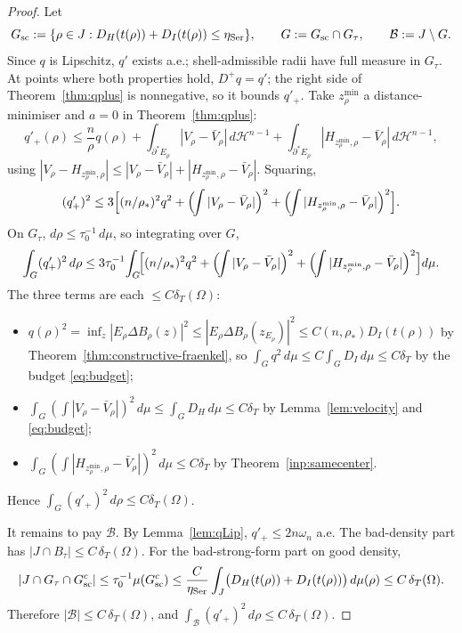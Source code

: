 \documentclass[11pt]{amsart}
\theoremstyle{definition}
\newcommand{\Om}{\Omega}
\newcommand{\dT}{\delta_T}
\newcommand{\rstar}{\rho_*}
\newcommand{\Hn}{\mathcal H^{n-1}}
\begin{document}
\begin{proof}
Let
\[
   G_{\rm sc}:=\{\rho\in J:
      D_H(t(\rho))+D_I(t(\rho))\le\eta_{\rm Ser}\},
   \qquad
   G:=G_{\rm sc}\cap G_\tau,
   \qquad \mathcal B:=J\setminus G .
\]
Since \(q\) is Lipschitz, \(q'\) exists a.e.; shell-admissible radii have full
measure in \(G_\tau\).  At points where both properties hold, \(D^+q=q'\); the
right side of Theorem~\ref{thm:qplus} is nonnegative, so it bounds \(q'_+\).
Take \(z_\rho^{\min}\) a distance-minimiser and \(a=0\) in
Theorem~\ref{thm:qplus}:
\[
   q'_+(\rho)\le \frac{n}{\rho}q(\rho)
   +\int_{\partial^*E_\rho}|V_\rho-\bar V_\rho|\,d\Hn
   +\int_{\partial^*E_\rho}|H_{z_\rho^{\min},\rho}-\bar V_\rho|\,d\Hn ,
\]
using \(|V_\rho-H_{z_\rho^{\min},\rho}|\le|V_\rho-\bar V_\rho|+
|H_{z_\rho^{\min},\rho}-\bar V_\rho|\).  Squaring,
\[
   (q'_+)^2\le 3\Bigl[(n/\rstar)^2 q^2
   +\Bigl(\!\int|V_\rho-\bar V_\rho|\Bigr)^2
   +\Bigl(\!\int|H_{z_\rho^{\min},\rho}-\bar V_\rho|\Bigr)^2\Bigr].
\]
On \(G_\tau\), \(d\rho\le\tau_0^{-1}\,d\mu\), so integrating over \(G\),
\[
   \int_G(q'_+)^2\,d\rho
   \le 3\tau_0^{-1}\!\int_G\!\Bigl[(n/\rstar)^2 q^2
   +\Bigl(\!\int|V_\rho-\bar V_\rho|\Bigr)^2
   +\Bigl(\!\int|H_{z_\rho^{\min},\rho}-\bar V_\rho|\Bigr)^2\Bigr]d\mu .
\]
The three terms are each \(\le C\dT(\Om)\):
\begin{itemize}[leftmargin=2em]
\item \(q(\rho)^2=\inf_z|E_\rho\Delta B_\rho(z)|^2\le|E_\rho\Delta B_\rho(z_{E_\rho})|^2
\le C(n,\rstar)D_I(t(\rho))\) by Theorem~\ref{thm:constructive-fraenkel}, so
\(\int_G q^2\,d\mu\le C\int_G D_I\,d\mu\le C\dT\) by the budget \eqref{eq:budget};
\item \(\int_G(\int|V_\rho-\bar V_\rho|)^2\,d\mu\le\int_G D_H\,d\mu\le C\dT\) by
Lemma~\ref{lem:velocity} and \eqref{eq:budget};
\item \(\int_G(\int|H_{z_\rho^{\min},\rho}-\bar V_\rho|)^2\,d\mu\le C\dT\) by
Theorem~\ref{inp:samecenter}.
\end{itemize}
Hence \(\int_G(q'_+)^2\,d\rho\le C\dT(\Om)\).

It remains to pay \(\mathcal B\).  By Lemma~\ref{lem:qLip},
\(q'_+\le2n\omega_n\) a.e.  The bad-density part has
\(|J\cap B_\tau|\le C\,\dT(\Om)\).  For the bad-strong-form part on good
density,
\[
   |J\cap G_\tau\cap G_{\rm sc}^c|
   \le \tau_0^{-1}\mu(G_{\rm sc}^c)
   \le \frac{C}{\eta_{\rm Ser}}
      \int_J\bigl(D_H(t(\rho))+D_I(t(\rho))\bigr)\,d\mu(\rho)
   \le C\,\dT(\Om).
\]
Therefore \(|\mathcal B|\le C\,\dT(\Om)\), and
\(\int_{\mathcal B}(q'_+)^2\,d\rho\le C\,\dT(\Om)\).
\end{proof}
\end{document}
